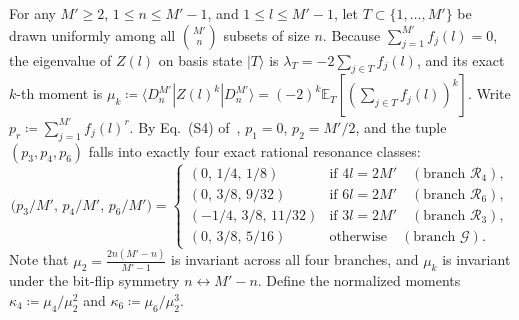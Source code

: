\documentclass[11pt,a4paper]{article}
\theoremstyle{remark}
\newcommand{\ket}[1]{\lvert #1 \rangle}
\newcommand{\E}{\mathbb{E}}
\begin{document}
For any $M' \ge 2$, $1 \le n \le M'-1$, and $1 \le l \le M'-1$, let $T \subset \{1,\dots,M'\}$ be drawn uniformly among all $\binom{M'}{n}$ subsets of size $n$. Because $\sum_{j=1}^{M'} f_j(l) = 0$, the eigenvalue of $Z(l)$ on basis state $\ket{T}$ is $\lambda_T = -2 \sum_{j \in T} f_j(l)$, and its exact $k$-th moment is $\mu_k \coloneqq \langle D_n^{M'} | Z(l)^k | D_n^{M'} \rangle = (-2)^k \E_T[(\sum_{j \in T} f_j(l))^k]$. Write $p_r \coloneqq \sum_{j=1}^{M'} f_j(l)^r$. By Eq.~(S4) of~\cite{AKN26}, $p_1 = 0$, $p_2 = M'/2$, and the tuple $(p_3, p_4, p_6)$ falls into exactly four exact rational resonance classes:
\begin{equation}
\label{eq:branches}
\bigl(p_3/M',\, p_4/M',\, p_6/M'\bigr) = \begin{cases}
(0,\, 1/4,\, 1/8) & \text{if } 4l = 2M' \quad (\text{branch }\mathcal{R}_4),\\
(0,\, 3/8,\, 9/32) & \text{if } 6l = 2M' \quad (\text{branch }\mathcal{R}_6),\\
(-1/4,\, 3/8,\, 11/32) & \text{if } 3l = 2M' \quad (\text{branch }\mathcal{R}_3),\\
(0,\, 3/8,\, 5/16) & \text{otherwise} \quad (\text{branch }\mathcal{G}).
\end{cases}
\end{equation}
Note that $\mu_2 = \frac{2n(M'-n)}{M'-1}$ is invariant across all four branches, and $\mu_k$ is invariant under the bit-flip symmetry $n \leftrightarrow M' - n$. Define the normalized moments $\kappa_4 \coloneqq \mu_4/\mu_2^2$ and $\kappa_6 \coloneqq \mu_6/\mu_2^3$.
\end{document}
